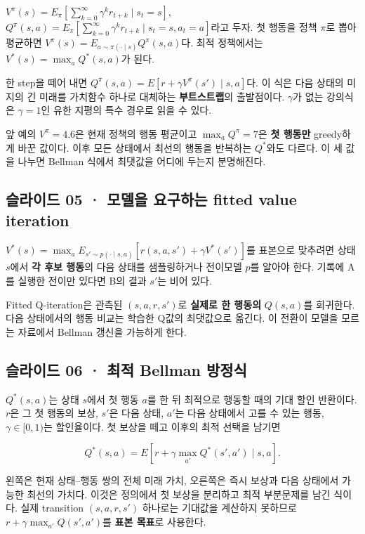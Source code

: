 \documentclass[11pt,a4paper]{article}
\begin{document}
$V^\pi(s)=E_\pi[\sum_{k=0}^\infty\gamma^k r_{t+k}\mid s_t=s]$, $Q^\pi(s,a)=E_\pi[\sum_{k=0}^\infty\gamma^k r_{t+k}\mid s_t=s,a_t=a]$라고 두자. 첫 행동을 정책 $\pi$로 뽑아 평균하면 $V^\pi(s)=E_{a\sim\pi(\cdot\mid s)}Q^\pi(s,a)$다. 최적 정책에서는 $V^*(s)=\max_a Q^*(s,a)$가 된다.\par

한 step을 떼어 내면 $Q^\pi(s,a)=E[r+\gamma V^\pi(s')\mid s,a]$다. 이 식은 다음 상태의 미지의 긴 미래를 가치함수 하나로 대체하는 \textbf{부트스트랩}의 출발점이다. $\gamma$가 없는 강의식은 $\gamma=1$인 유한 지평의 특수 경우로 읽을 수 있다.\par

앞 예의 $V^\pi=4.6$은 현재 정책의 행동 평균이고 $\max_aQ^\pi=7$은 \textbf{첫 행동만} greedy하게 바꾼 값이다. 이후 모든 상태에서 최선의 행동을 반복하는 $Q^*$와도 다르다. 이 세 값을 나누면 Bellman 식에서 최댓값을 어디에 두는지 분명해진다.\par

\subsection{슬라이드 05 · 모델을 요구하는 fitted value iteration}

$V^*(s)=\max_a E_{s'\sim p(\cdot\mid s,a)}[r(s,a,s')+\gamma V^*(s')]$를 표본으로 맞추려면 상태 $s$에서 \textbf{각 후보 행동}의 다음 상태를 샘플링하거나 전이모델 $p$를 알아야 한다. 기록에 A를 실행한 전이만 있다면 B의 결과 $s'$는 비어 있다.\par

Fitted Q-iteration은 관측된 $(s,a,r,s')$로 \textbf{실제로 한 행동의} $Q(s,a)$를 회귀한다. 다음 상태에서의 행동 비교는 학습한 Q값의 최댓값으로 옮긴다. 이 전환이 모델을 모르는 자료에서 Bellman 갱신을 가능하게 한다.\par

\subsection{슬라이드 06 · 최적 Bellman 방정식}

$Q^*(s,a)$는 상태 $s$에서 첫 행동 $a$를 한 뒤 최적으로 행동할 때의 기대 할인 반환이다. $r$은 그 첫 행동의 보상, $s'$은 다음 상태, $a'$는 다음 상태에서 고를 수 있는 행동, $\gamma\in[0,1)$는 할인율이다. 첫 보상을 떼고 이후의 최적 선택을 남기면\par

\[
Q^*(s,a)=E\!\left[r+\gamma\max_{a'}Q^*(s',a')\mid s,a\right].
\]

왼쪽은 현재 상태–행동 쌍의 전체 미래 가치, 오른쪽은 즉시 보상과 다음 상태에서 가능한 최선의 가치다. 이것은 정의에서 첫 보상을 분리하고 최적 부분문제를 남긴 식이다. 실제 transition $(s,a,r,s')$ 하나로는 기대값을 계산하지 못하므로 $r+\gamma\max_{a'}Q(s',a')$를 \textbf{표본 목표}로 사용한다.\par
\end{document}
